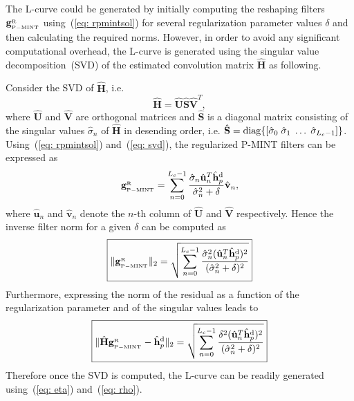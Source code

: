 \documentclass{article}
\begin{document}
The L-curve could be generated by initially computing the reshaping filters $\mathbf{g}_{{}_{\rm P-MINT}}^{_{\rm R}}$ using~(\ref{eq: rpmintsol}) for several regularization parameter values $\delta$ and then calculating the required norms.
However, in order to avoid any significant computational overhead, the L-curve is generated using the singular value decomposition~(SVD) of the estimated convolution matrix $\hat{\mathbf{H}}$ as following.

Consider the SVD of $\hat{\mathbf{H}}$, i.e.
\begin{equation}
\label{eq: svd}
  \hat{\mathbf{H}} = \hat{\mathbf{U}}\hat{\mathbf{S}}\hat{\mathbf{V}}^T,
\end{equation}
where $\hat{\mathbf{U}}$ and $\hat{\mathbf{V}}$ are orthogonal matrices and $\hat{\mathbf{S}}$ is a diagonal matrix consisting of the singular values $\hat{\sigma}_n$ of $\hat{\mathbf{H}}$ in desending order, i.e. $\hat{\mathbf{S}} = {\rm diag}\{\left[\hat{\sigma}_0 \; \hat{\sigma}_1 \; \ldots \; \hat{\sigma}_{L_c-1}\right]\}$. Using~(\ref{eq: rpmintsol}) and~(\ref{eq: svd}), the regularized P-MINT filters can be expressed as
\begin{equation}
\mathbf{g}_{{}_{\rm P-MINT}}^{_{\rm R}}  =  \sum_{n=0}^{L_c-1} \frac{\hat{\sigma}_n \hat{\mathbf{u}}_n^T \hat{\mathbf{h}}_p^{\rm d} }{\hat{\sigma}_n^2+\delta}  \hat{\mathbf{v}}_n,
\end{equation}
where $\hat{\mathbf{u}}_n$ and $\hat{\mathbf{v}}_n$ denote the $n$-th column of $\hat{\mathbf{U}}$ and $\hat{\mathbf{V}}$ respectively.
Hence the inverse filter norm for a given $\delta$ can be computed as
\begin{equation}
\label{eq: eta}
\boxed{\|\mathbf{g}_{{}_{\rm P-MINT}}^{_{\rm R}}\|_2 = \sqrt{\sum_{n = 0}^{L_c-1} \frac{\hat{\sigma}_n^2 (\hat{\mathbf{u}}_n^T \hat{\mathbf{h}}_p^{\rm d})^2}{(\hat{\sigma}_n^2 + \delta)^2}}}
\end{equation}
Furthermore, expressing the norm of the residual as a function of the regularization parameter and of the singular values leads to
\begin{equation}
\label{eq: rho}
\boxed{ \|\hat{\mathbf{H}}\mathbf{g}_{{}_{\rm P-MINT}}^{_{\rm R}} - \hat{\mathbf{h}}_p^{\rm d}\|_2 = \sqrt{\sum_{n = 0}^{L_c-1} \frac{\delta^2 (\hat{\mathbf{u}}_n^T \hat{\mathbf{h}}_p^{\rm d})^2}{(\hat{\sigma}_n^2 + \delta)^2}}}
\end{equation}
Therefore once the SVD is computed, the L-curve can be readily generated using~(\ref{eq: eta}) and~(\ref{eq: rho}).
\end{document}
